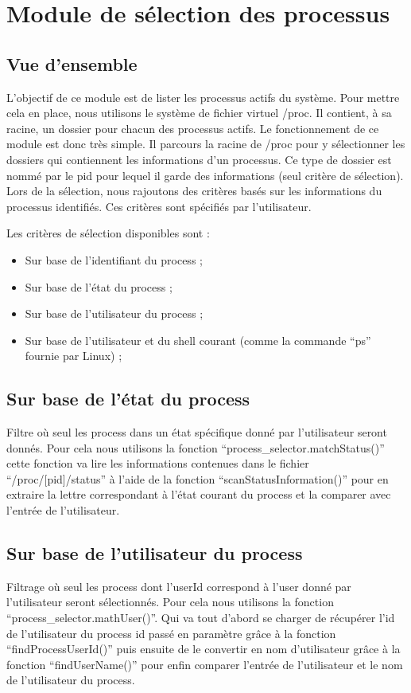 \section{Module de sélection des processus}
\subsection{Vue d'ensemble}
L'objectif de ce module est de lister les processus actifs du système. Pour mettre cela en place, nous utilisons le système de fichier virtuel /proc. Il contient, à sa racine, un dossier pour chacun des processus actifs. Le fonctionnement de ce module est donc très simple. Il parcours la racine de /proc pour y sélectionner les dossiers qui contiennent les informations d'un processus. Ce type de dossier est nommé par le pid pour lequel il garde des informations (seul critère de sélection). Lors de la sélection, nous rajoutons des critères basés sur les informations du processus identifiés. Ces critères sont spécifiés par l'utilisateur.

Les critères de sélection disponibles sont :

\begin{itemize}
\item Sur base de l'identifiant du process ;
\item Sur base de l’état du process ;
\item Sur base de l’utilisateur du process ;
\item Sur base de l’utilisateur et du shell courant (comme la commande “ps” 
fournie par Linux) ;
\end{itemize}

\subsection{Sur base de l'état du process} 
Filtre où seul les process dans un état spécifique donné par l’utilisateur seront donnés. Pour cela nous utilisons la fonction “process\_selector.matchStatus()” cette fonction va lire les informations contenues dans le fichier “/proc/[pid]/status” à l’aide de la fonction “scanStatusInformation()” pour en extraire la lettre correspondant à l’état courant du process et la comparer avec l’entrée de l’utilisateur.

\subsection{Sur base de l’utilisateur du process}
Filtrage où seul les process dont l’userId correspond à l’user donné par l’utilisateur seront sélectionnés. Pour cela nous utilisons la fonction “process\_selector.mathUser()”. Qui va tout d’abord se charger de récupérer l’id de l’utilisateur du process id passé en paramètre grâce à la fonction “findProcessUserId()” puis ensuite de le convertir en nom d’utilisateur grâce à la fonction “findUserName()” pour enfin comparer l’entrée de l’utilisateur et le nom de l’utilisateur du process.

